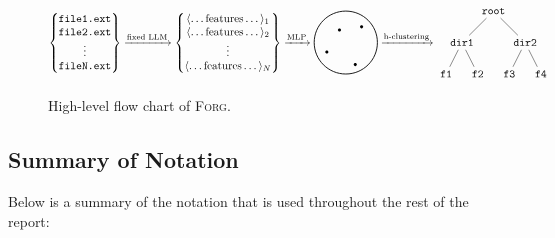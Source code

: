 \documentclass{article}
\begin{document}
\begin{figure}[ht]
  \begin{align*}
    \begin{Bmatrix}
      \texttt{file1.ext} \\
      \texttt{file2.ext} \\
      \vdots             \\
      \texttt{fileN.ext}
    \end{Bmatrix}
    \xrightarrow{\text{fixed LLM}}
    \begin{Bmatrix}
      \langle \dots \text{features} \dots \rangle_1 \\
      \langle \dots \text{features} \dots \rangle_2 \\
      \vdots                                        \\
      \langle \dots \text{features} \dots \rangle_N
    \end{Bmatrix}
    \xrightarrow{\text{MLP}}
    \begin{tikzpicture}[baseline={(0,-0.1)}]
      \draw[thick] (0,0) circle (1);
      \fill (0.5,0.5) circle (0.05);
      \fill (-0.2,0.4) circle (0.05);
      \fill (0.3,-0.7) circle (0.05);
      \fill (-0.6,-0.3) circle (0.05);
    \end{tikzpicture}
    \xrightarrow{\text{h-clustering}}
    \begin{tikzpicture}[baseline={(0,-1.1)}]
      \node (root) at (0,0) {\texttt{root}};
      \node (dir1) at (-1,-1) {\texttt{dir1}};
      \node (dir2) at (1,-1) {\texttt{dir2}};
      \node (file1) at (-1.5,-2) {\texttt{f1}};
      \node (file2) at (-0.5,-2) {\texttt{f2}};
      \node (file3) at (0.5,-2) {\texttt{f3}};
      \node (file4) at (1.5,-2) {\texttt{f4}};
      \draw (root) -- (dir1);
      \draw (root) -- (dir2);
      \draw (dir1) -- (file1);
      \draw (dir1) -- (file2);
      \draw (dir2) -- (file3);
      \draw (dir2) -- (file4);
    \end{tikzpicture}
  \end{align*}
  \caption{High-level flow chart of \textsc{Forg}.}
\end{figure}


\subsection{Summary of Notation}

Below is a summary of the notation that is used throughout the rest of the report:
\end{document}
